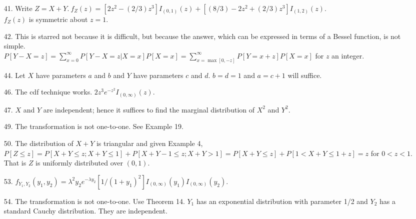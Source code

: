 \begin{enumerate}
	\item[41.] Write $Z=X+Y.\ f_Z(z) = [2z^2-(2/3)z^3]I_{(0,1)}(z) + [(8/3)-2z^2+(2/3)z^3]I_{(1,2)}(z)$. \\
	$f_Z(z)$ is symmetric about $z=1$.
	
	\item[42.] This is starred not because it is difficult, but because the answer, which can be expressed in terms of a Bessel function, is not simple. \\
	$P[Y-X=z] = \displaystyle\sum_{x=0}^{\infty}P[Y-X=z\vert X=x]P[X=x] = \sum_{x=\max[0,-z]}^{\infty} P[Y=x+z]P[X=x]$ for $z$ an integer.
	
	\newpage
	
	\item[44.] Let $X$ have parameters $a$ and $b$ and $Y$ have parameters $c$ and $d$. $b=d=1$ and $a=c+1$ will suffice.
	
	\item[46.] The cdf technique works. $2z^3e^{-z^2}I_{(0,\infty)}(z)$.
	
	\item[47.] $X$ and $Y$ are independent; hence it suffices to find the marginal distribution of $X^2$ and $Y^2$.
	
	\item[49.] The transformation is not one-to-one. See Example 19.
	
	\item[50.] The distribution of $X+Y$ is triangular and given Example 4, 
	$P[Z\le z] = P[X+Y\le z; X+Y\le 1] + P[X+Y-1\le z; X+Y>1] = P[X+Y\le z] + P[1<X+Y\le 1+z] = z$ for $0<z<1$. That is $Z$ is uniformly distributed over $(0,1)$.
	
	\item[53.] $f_{Y_1,Y_2}(y_1,y_2) = \lambda^2y_2e^{-\lambda y_2}[1/(1+y_1)^2]I_{(0,\infty)}(y_1)I_{(0,\infty)}(y_2)$.
	
	\item[54.] The transformation is not one-to-one.  Use Theorem 14. $Y_1$ has an exponential distribution with parameter 1/2 and $Y_2$ has a standard Cauchy distribution.  They are independent.	
	

\end{enumerate}
